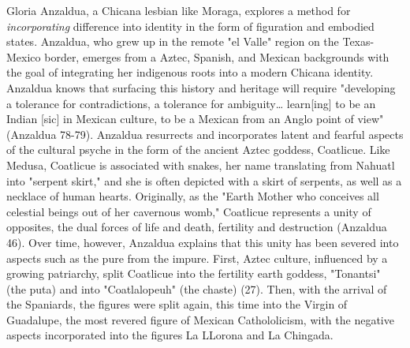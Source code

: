 \documentclass[11pt]{article}
\begin{document}
Gloria Anzaldua, a Chicana lesbian like Moraga, explores a method for
\emph{incorporating} difference into identity in the form of figuration and
embodied states. Anzaldua, who grew up in the remote "el Valle" region
on the Texas-Mexico border, emerges from a Aztec, Spanish, and Mexican
backgrounds with the goal of integrating her indigenous roots into a
modern Chicana identity. Anzaldua knows that surfacing this history
and heritage will require "developing a tolerance for contradictions,
a tolerance for ambiguity\ldots{} learn[ing] to be an Indian [sic] in
Mexican culture, to be a Mexican from an Anglo point of view"
(Anzaldua 78-79). Anzaldua resurrects and incorporates latent and
fearful aspects of the cultural psyche in the form of the ancient
Aztec goddess, Coatlicue. Like Medusa, Coatlicue is associated with
snakes, her name translating from Nahuatl into "serpent skirt," and
she is often depicted with a skirt of serpents, as well as a necklace
of human hearts. Originally, as the "Earth Mother who conceives all
celestial beings out of her cavernous womb," Coatlicue represents a
unity of opposites, the dual forces of life and death, fertility and
destruction (Anzaldua 46). Over time, however, Anzaldua explains that
this unity has been severed into aspects such as the pure from the
impure. First, Aztec culture, influenced by a growing patriarchy,
split Coatlicue into the fertility earth goddess, "Tonantsi" (the
puta) and into "Coatlalopeuh" (the chaste) (27). Then, with the
arrival of the Spaniards, the figures were split again, this time into
the Virgin of Guadalupe, the most revered figure of Mexican
Cathololicism, with the negative aspects incorporated into the figures
La LLorona and La Chingada.
\end{document}
